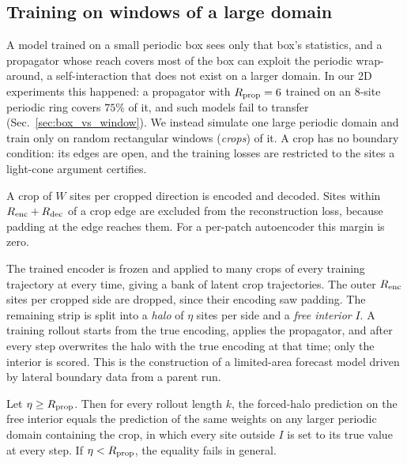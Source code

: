 \subsection{Training on windows of a large domain}
\label{sec:crop_training}

A model trained on a small periodic box sees only that box's statistics,
and a propagator whose reach covers most of the box can exploit the
periodic wrap-around, a self-interaction that does not exist on a larger
domain. In our 2D experiments this happened: a propagator with
$R_{\mathrm{prop}}=6$ trained on an $8$-site periodic ring covers $75\%$ of it, and
such models fail to transfer (Sec.~\ref{sec:box_vs_window}). We instead
simulate one large periodic domain and train only on random rectangular
windows (\emph{crops}) of it. A crop has no boundary condition: its
edges are open, and the training losses are restricted to the sites a
light-cone argument certifies.

A crop of $W$ sites per cropped direction is encoded and decoded. Sites
within $R_{\mathrm{enc}}+R_{\mathrm{dec}}$ of a crop edge are excluded from the
reconstruction loss, because padding at the edge reaches them. For a
per-patch autoencoder this margin is zero.

The trained encoder is frozen and applied to many crops of every training
trajectory at every time, giving a bank of latent crop trajectories.
The outer $R_{\mathrm{enc}}$ sites per cropped side are dropped, since their
encoding saw padding. The remaining strip is split into a \emph{halo}
of $\eta$ sites per side and a \emph{free interior} $I$. A training
rollout starts from the true encoding, applies the propagator, and after
every step overwrites the halo with the true encoding at that time; only
the interior is scored. This is the construction of a limited-area
forecast model driven by lateral boundary data from a parent run.

\begin{proposition}
\label{prop:halo}
Let $\eta\ge R_{\mathrm{prop}}$. Then for every rollout length $k$, the forced-halo
prediction on the free interior equals the prediction of the same
weights on any larger periodic domain containing the crop, in which every
site outside $I$ is set to its true value at every step. If
$\eta<R_{\mathrm{prop}}$, the equality fails in general.
\end{proposition}

